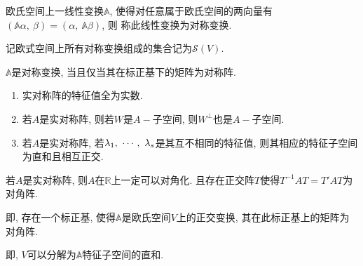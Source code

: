 \begin{definition}[对称变换]
    欧氏空间上一线性变换$\mathbb{A}$, 使得对任意属于欧氏空间的两向量有$(\mathbb{A}\alpha,\ \beta)=(\alpha,\ \mathbb{A}\beta)$, 则
    称此线性变换为对称变换.\par
    记欧式空间上所有对称变换组成的集合记为$\mathscr{S}(V)$.
\end{definition}

\begin{theorem}[对称变换的充要条件]
    $\mathbb{A}$是对称变换, 当且仅当其在标正基下的矩阵为对称阵.
\end{theorem}

\begin{property}
    \par
    \begin{enumerate}[itemindent=1em]
        \item 实对称阵的特征值全为实数.
        \item 若$A$是实对称阵, 则若$W$是$A-$子空间, 则$W^{\perp}$也是$A-$子空间.
        \item 若$A$是实对称阵, 若${\lambda}{_1},\ \cdots,\ {\lambda}{_{s}}$是其互不相同的特征值, 则其相应的特征子空间为直和且相互正交.
    \end{enumerate}
\end{property}

\begin{theorem}[实对称阵可对角化]
    若$A$是实对称阵, 则$A$在$\mathbb{R}$上一定可以对角化. 且存在正交阵$T$使得$T^{-1}AT=T'AT$为对角阵.\par
    即, 存在一个标正基, 使得$\mathbb{A}$是欧氏空间$V$上的正交变换, 其在此标正基上的矩阵为对角阵.\par
    即, $V$可以分解为$\mathbb{A}$特征子空间的直和.
\end{theorem}
